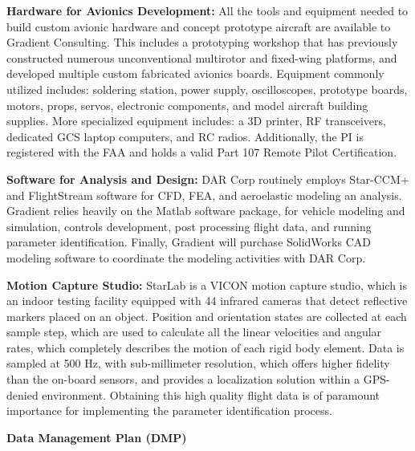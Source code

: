 \documentclass[11pt]{article}
\begin{document}
{\bf Hardware for Avionics Development:}
All the tools and equipment needed to build custom avionic hardware and concept prototype aircraft are available to Gradient Consulting.  This includes a prototyping workshop that has previously constructed numerous unconventional multirotor and fixed-wing platforms, and developed multiple custom fabricated avionics boards.  Equipment commonly utilized includes: soldering station, power supply, oscilloscopes, prototype boards, motors, props, servos, electronic components, and model aircraft building supplies.  More specialized equipment includes: a 3D printer, RF transceivers, dedicated GCS laptop computers, and RC radios.  Additionally, the PI is registered with the FAA and holds a valid Part 107 Remote Pilot Certification.


{\bf Software for Analysis and Design:}
DAR Corp routinely employs Star-CCM+ and FlightStream software for CFD, FEA, and aeroelastic modeling an analysis.  Gradient relies heavily on the Matlab software package, for vehicle modeling and simulation, controls development, post processing flight data, and running parameter identification.  Finally, Gradient will purchase SolidWorks CAD modeling software to coordinate the modeling activities with DAR Corp.


{\bf Motion Capture Studio:}
StarLab is a VICON motion capture studio, which is an indoor testing facility equipped with 44 infrared cameras that detect reflective markers placed on an object.  Position and orientation states are collected at each sample step, which are used to calculate all the linear velocities and angular rates, which completely describes the motion of each rigid body element.  Data is sampled at 500 Hz, with sub-millimeter resolution, which offers higher fidelity than the on-board sensors, and provides a localization solution within a GPS-denied environment.  Obtaining this high quality flight data is of paramount importance for implementing the parameter identification process.








\newpage
{\bf \Huge Data Management Plan (DMP)}
\end{document}
